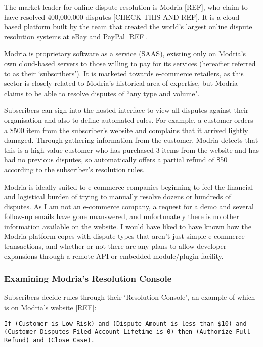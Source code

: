The market leader for online dispute resolution is Modria [REF], who claim to have resolved 400,000,000 disputes [CHECK THIS AND REF]. It is a cloud-based platform built by the team that created the world's largest online dispute resolution systems at eBay and PayPal [REF].

Modria is proprietary software as a service (SAAS), existing only on Modria's own cloud-based servers to those willing to pay for its services (hereafter referred to as their `subscribers'). It is marketed towards e-commerce retailers, as this sector is closely related to Modria's historical area of expertise, but Modria claims to be able to resolve disputes of ``any type and volume". %

Subscribers can sign into the hosted interface to view all disputes against their organisation and also to define automated rules. For example, a customer orders a \$500 item from the subscriber's website and complains that it arrived lightly damaged. Through gathering information from the customer, Modria detects that this is a high-value customer who has purchased 3 items from the website and has had no previous disputes, so automatically offers a partial refund of \$50 according to the subscriber's resolution rules. %

Modria is ideally suited to e-commerce companies beginning to feel the financial and logistical burden of trying to manually resolve dozens or hundreds of disputes. As I am not an e-commerce company, a request for a demo and several follow-up emails have gone unanswered, and unfortunately there is no other information available on the website. I would have liked to have known how the Modria platform copes with dispute types that aren't just simple e-commerce transactions, and whether or not there are any plans to allow developer expansions through a remote API or embedded module/plugin facility.

\subsubsection{Examining Modria's Resolution Console}

Subscribers decide rules through their `Resolution Console', an example of which is on Modria's website [REF]:

\begin{lstlisting}
If (Customer is Low Risk) and (Dispute Amount is less than $10) and (Customer Disputes Filed Account Lifetime is 0) then (Authorize Full Refund) and (Close Case).
\end{lstlisting}

